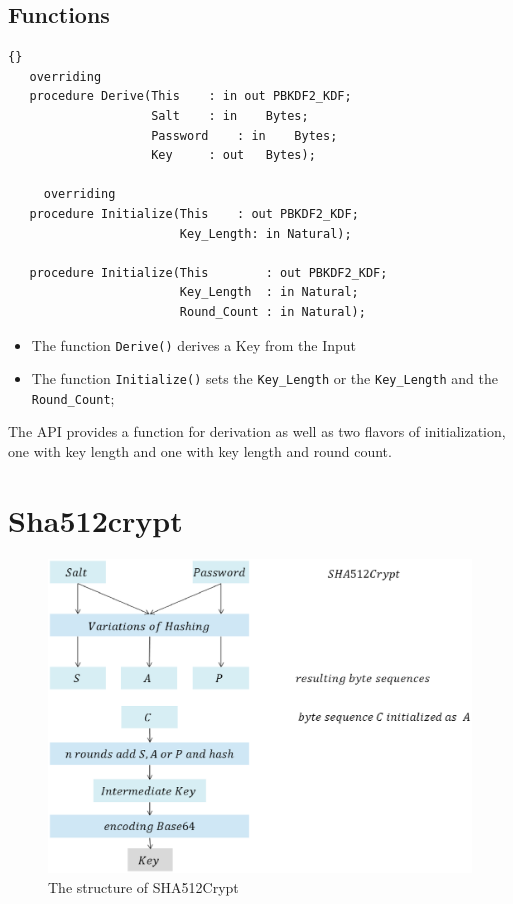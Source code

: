 \subsection*{Functions}
\begin{lstlisting}{}
   overriding
   procedure Derive(This	: in out PBKDF2_KDF;
                    Salt	: in 	Bytes;
                    Password	: in	Bytes;
                    Key		: out	Bytes);
										
	 overriding
   procedure Initialize(This	: out PBKDF2_KDF;
                        Key_Length: in Natural);

   procedure Initialize(This		: out PBKDF2_KDF;
                        Key_Length	: in Natural;
                        Round_Count	: in Natural);

\end{lstlisting}
\begin{itemize}
	\item The function \texttt{Derive()} derives a Key from the Input
	\item The function \texttt{Initialize()} sets the \texttt{Key\_Length} or the \texttt{Key\_Length} and the \texttt{Round\_Count};
\end{itemize}
The API provides a function for derivation as well as two flavors of initialization, one with key length and one with key length and round count.

\section{Sha512crypt}

\begin{figure}[ht!]
\centering
\includegraphics[width=150mm]{./images/SHA512Crypt}
\caption{The structure of SHA512Crypt}
\end{figure}

